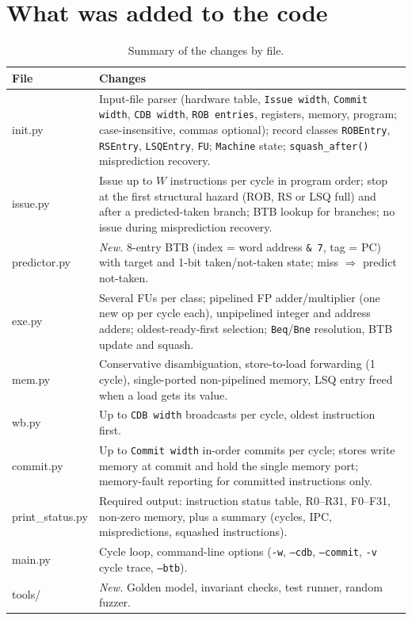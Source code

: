 \documentclass[11pt]{article}
\begin{document}
\section{What was added to the code}
\begin{table}[H]\centering\small
\begin{tabular}{@{}>{\ttfamily}l p{}@{}}\toprule
\normalfont File & Changes \\\midrule
init.py & Input-file parser (hardware table, \texttt{Issue width}, \texttt{Commit width},
  \texttt{CDB width}, \texttt{ROB entries}, registers, memory, program; case-insensitive, commas
  optional); record classes \texttt{ROBEntry}, \texttt{RSEntry}, \texttt{LSQEntry}, \texttt{FU};
  \texttt{Machine} state; \texttt{squash\_after()} misprediction recovery. \\
issue.py & Issue up to $W$ instructions per cycle in program order; stop at the first structural
  hazard (ROB, RS or LSQ full) and after a predicted-taken branch; BTB lookup for branches; no
  issue during misprediction recovery. \\
predictor.py & \emph{New.} 8-entry BTB (index = word address \texttt{\&\,7}, tag = PC) with
  target and 1-bit taken/not-taken state; miss $\Rightarrow$ predict not-taken. \\
exe.py & Several FUs per class; pipelined FP adder/multiplier (one new op per cycle each),
  unpipelined integer and address adders; oldest-ready-first selection; \texttt{Beq}/\texttt{Bne}
  resolution, BTB update and squash. \\
mem.py & Conservative disambiguation, store-to-load forwarding (1 cycle), single-ported
  non-pipelined memory, LSQ entry freed when a load gets its value. \\
wb.py & Up to \texttt{CDB width} broadcasts per cycle, oldest instruction first. \\
commit.py & Up to \texttt{Commit width} in-order commits per cycle; stores write memory at commit
  and hold the single memory port; memory-fault reporting for committed instructions only. \\
print\_status.py & Required output: instruction status table, R0--R31, F0--F31, non-zero
  memory, plus a summary (cycles, IPC, mispredictions, squashed instructions). \\
main.py & Cycle loop, command-line options (\texttt{-w}, \texttt{--cdb}, \texttt{--commit},
  \texttt{-v} cycle trace, \texttt{--btb}). \\
tools/ & \emph{New.} Golden model, invariant checks, test runner, random fuzzer. \\
\bottomrule\end{tabular}
\caption{Summary of the changes by file.}
\end{table}
\end{document}
